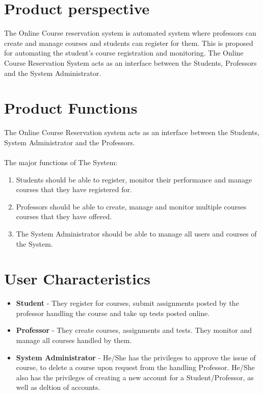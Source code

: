\documentclass[12pt, a4]{report}
\begin{document}
\section{Product perspective}
The Online Course reservation system is automated system where professors can create and manage courses and students can register for them. This is proposed for automating the student’s course registration and monitoring. The Online Course Reservation System acts as an interface between the Students, Professors and the System Administrator.


\section{Product Functions}
The Online Course Reservation system acts as an interface between the Students, System Administrator and the Professors.
\\\\
The major functions of The System:
\begin{enumerate}
    \item Students should be able to register, monitor their performance and manage courses that they have registered for.
    \item Professors should be able to create, manage and monitor multiple courses courses that they have offered.
    \item The System Administrator should be able to manage all users and courses of the System.
\end{enumerate}


\section{User Characteristics}
\begin{itemize}
    \item \textbf{Student} - They register for courses, submit assignments posted by the professor handling the course and take up tests posted online.
    \item \textbf{Professor} - They create courses, assignments and tests. They monitor and manage all courses handled by them.
    \item \textbf{System Administrator} - He/She has the privileges to approve the issue of course, to delete a course upon request from the handling Professor. He/She also has the privileges of creating a new account for a Student/Professor, as well as deltion of accounts.
\end{itemize}
\end{document}
